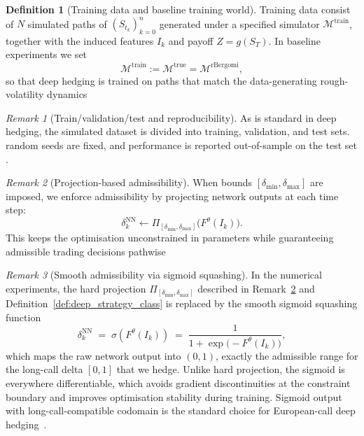 \documentclass[12pt,a4paper]{article}
\theoremstyle{definition}
\newtheorem{definition}{Definition}[section]
\theoremstyle{plain}
\theoremstyle{remark}
\newtheorem{remark}{Remark}[section]
\theoremstyle{plain}
\begin{document}
\label{subsubsec:deep_training_protocol}

\begin{definition}[Training data and baseline training world]
\label{def:deep_training_data}
Training data consist of $N$ simulated paths of $(S_{t_k})_{k=0}^n$ generated under a specified simulator $\mathcal{M}^{\mathrm{train}}$,
together with the induced features $I_k$ and payoff $Z=g(S_T)$.
In baseline experiments we set
\[
\mathcal{M}^{\mathrm{train}} := \mathcal{M}^{\mathrm{true}}=\mathcal{M}^{\mathrm{rBergomi}},
\]
so that deep hedging is trained on paths that match the data-generating rough-volatility dynamics \cite{BayerFriz2016,Horvath2021DeepRough}
\end{definition}

\begin{remark}[Train/validation/test and reproducibility]
\label{rem:split_reproducibility}
As is standard in deep hedging, the simulated dataset is divided into training, validation, and test sets.
random seeds are fixed, and performance is reported out-of-sample on the test set \cite{Buehler2019DeepHedging,Horvath2021DeepRough}.
\end{remark}

\label{subsubsec:deep_constraints}

\begin{remark}[Projection-based admissibility]
\label{rem:projection_constraints}
When bounds $[\delta_{\min},\delta_{\max}]$ are imposed, we enforce admissibility by projecting network outputs at each time step:
\[
\delta_k^{\mathrm{NN}} \leftarrow \Pi_{[\delta_{\min},\delta_{\max}]}\!\bigl(F^\theta(I_k)\bigr).
\]
This keeps the optimisation unconstrained in parameters while guaranteeing admissible trading decisions pathwise \cite{Buehler2019DeepHedging}
\end{remark}

\begin{remark}[Smooth admissibility via sigmoid squashing]
\label{rem:sigmoid_squashing}
In the numerical experiments, the hard projection
$\Pi_{[\delta_{\min},\delta_{\max}]}$ described in
Remark~\ref{rem:projection_constraints} and
Definition~\ref{def:deep_strategy_class} is replaced by the smooth
sigmoid squashing function
\[
  \delta_k^{\mathrm{NN}}
  \;=\;
  \sigma\!\left(F^\theta(I_k)\right)
  \;=\;
  \frac{1}{1 + \exp\!\bigl(-F^\theta(I_k)\bigr)},
\]
which maps the raw network output into $(0, 1)$, exactly the admissible range for the long-call delta $[0, 1]$ that we hedge.
Unlike hard projection, the sigmoid is everywhere differentiable,
which avoids gradient discontinuities at the constraint boundary
and improves optimisation stability during training.
Sigmoid output with long-call-compatible codomain is the standard
choice for European-call deep hedging~\cite{Buehler2019DeepHedging}.
\end{remark}
\end{document}
